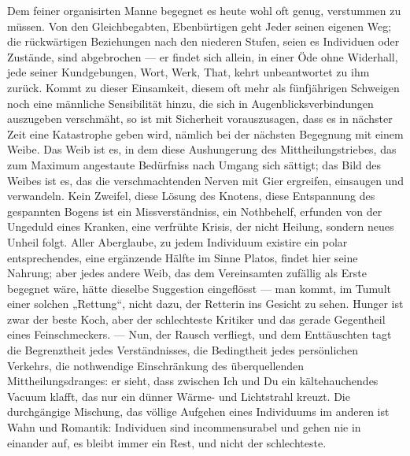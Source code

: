 Dem feiner organisirten Manne begegnet es heute wohl oft genug, verstummen zu müssen. Von den Gleichbegabten, Ebenbürtigen geht Jeder seinen eigenen Weg; die rückwärtigen Beziehungen nach den niederen Stufen, seien es Individuen oder Zustände, sind abgebrochen — er findet sich allein, in einer Öde ohne Widerhall, jede seiner Kundgebungen, Wort, Werk, That, kehrt unbeantwortet zu ihm zurück. Kommt zu dieser Einsamkeit, diesem oft mehr als fünfjährigen Schweigen noch eine männliche Sensibilität hinzu, die sich in Augenblicksverbindungen auszugeben verschmäht, so ist mit Sicherheit vorauszusagen, dass es in nächster Zeit eine Katastrophe geben wird, nämlich bei der nächsten Begegnung mit einem Weibe. Das Weib ist es, in dem diese Aushungerung des Mittheilungstriebes, das zum Maximum angestaute Bedürfniss nach Umgang sich sättigt; das Bild des Weibes ist es, das die verschmachtenden Nerven mit Gier ergreifen, einsaugen und verwandeln. Kein Zweifel, diese Lösung des Knotens, diese Entspannung des gespannten Bogens ist ein Missverständniss, ein Nothbehelf, erfunden von der Ungeduld eines Kranken, eine verfrühte Krisis, der nicht Heilung, sondern neues Unheil folgt. Aller Aberglaube, zu jedem Individuum existire ein polar entsprechendes, eine ergänzende Hälfte im Sinne Platos, findet hier seine Nahrung; aber jedes andere Weib, das dem Vereinsamten zufällig als Erste begegnet wäre, hätte dieselbe Suggestion eingeflösst — man kommt, im Tumult einer solchen „Rettung“, nicht dazu, der Retterin ins Gesicht zu sehen. Hunger ist zwar der beste Koch, aber der schlechteste Kritiker und das gerade Gegentheil eines Feinschmeckers. — Nun, der Rausch verfliegt, und dem Enttäuschten tagt die Begrenztheit jedes Verständnisses, die Bedingtheit jedes persönlichen Verkehrs, die nothwendige Einschränkung des überquellenden Mittheilungsdranges: er sieht, dass zwischen Ich und Du ein kältehauchendes Vacuum klafft, das nur ein dünner Wärme- und Lichtstrahl kreuzt. Die durchgängige Mischung, das völlige Aufgehen eines Individuums im anderen ist Wahn und Romantik: Individuen sind incommensurabel und gehen nie in einander auf, es bleibt immer ein Rest, und nicht der schlechteste.
\par

